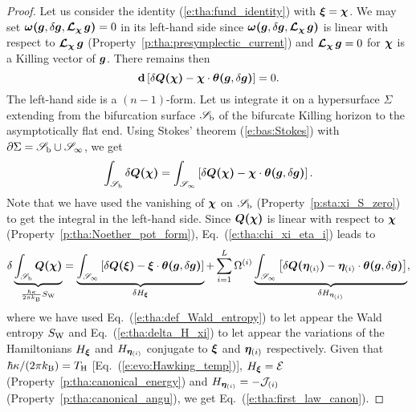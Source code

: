 \begin{proof}
Let us consider the identity (\ref{e:tha:fund_identity}) with $\bm{\xi} = \bm{\chi}$.
We may set $\bm{\omega}\textbf{(}\bm{g},\delta\bm{g}, \bm{\mathcal{L}}_{\bm{\chi}}\,\bm{g}\textbf{)} = 0$ in
its left-hand side since $\bm{\omega}\textbf{(}\bm{g},\delta\bm{g}, \bm{\mathcal{L}}_{\bm{\chi}}\,\bm{g}\textbf{)}$
is linear with respect to $\bm{\mathcal{L}}_{\bm{\chi}}\,\bm{g}$ (Property~\ref{p:tha:presymplectic_current})
and $\bm{\mathcal{L}}_{\bm{\chi}}\,\bm{g} = 0$ for $\bm{\chi}$ is a Killing vector of $\bm{g}$.
There remains then
\[
    \mathbf{d} \left[ \delta\bm{Q}\textbf{(}\bm{\chi}\textbf{)}
    - \bm{\chi}\cdot\bm{\theta}\textbf{(}\bm{g},\delta\bm{g}\textbf{)} \right] = 0 .
\]
The left-hand side is a $(n-1)$-form. Let us integrate it on a hypersurface $\Sigma$
extending from the bifurcation surface $\mathscr{S}_{\rm b}$ of the bifurcate
Killing horizon to the asymptotically flat end. Using
Stokes' theorem (\ref{e:bas:Stokes}) with $\partial\Sigma = \mathscr{S}_{\rm b} \cup \mathscr{S}_\infty$,
we get
\[
    \int_{\mathscr{S}_{\rm b}} \delta\bm{Q}\textbf{(}\bm{\chi}\textbf{)}
    = \int_{\mathscr{S}_\infty} \left[ \delta\bm{Q}\textbf{(}\bm{\chi}\textbf{)}
    - \bm{\chi}\cdot\bm{\theta}\textbf{(}\bm{g},\delta\bm{g}\textbf{)} \right] .
\]
Note that we have used the vanishing of $\bm{\chi}$ on $\mathscr{S}_{\rm b}$ (Property~\ref{p:sta:xi_S_zero})
to get the integral in the left-hand side. Since $\bm{Q}\textbf{(}\bm{\chi}\textbf{)}$
is linear with respect to $\bm{\chi}$ (Property~\ref{p:tha:Noether_pot_form}),
Eq.~(\ref{e:tha:chi_xi_eta_i}) leads to
\[
    \delta \underbrace{\int_{\mathscr{S}_{\rm b}}
    \bm{Q}\textbf{(}\bm{\chi}\textbf{)}}_{\frac{\hbar \kappa}{2\pi k_{\rm B}} S_{\rm W}} =
    \underbrace{\int_{\mathscr{S}_\infty} \left[ \delta\bm{Q}\textbf{(}\bm{\xi}\textbf{)}
    - \bm{\xi}\cdot\bm{\theta}\textbf{(}\bm{g},\delta\bm{g}\textbf{)} \right]}_{\delta H_{\bm{\xi}}}
    + \sum_{i=1}^{L} \Omega^{(i)}
    \underbrace{\int_{\mathscr{S}_\infty} \left[ \delta\bm{Q}\textbf{(}\bm{\eta}_{(i)}\textbf{)}
    - \bm{\eta}_{(i)}\cdot\bm{\theta}\textbf{(}\bm{g},\delta\bm{g}\textbf{)} \right]}_{\delta H_{\bm{\eta}_{(i)}}} ,
\]
where we have used Eq.~(\ref{e:tha:def_Wald_entropy}) to let appear
the Wald entropy $S_{\rm W}$ and
Eq.~(\ref{e:tha:delta_H_xi}) to let appear the
variations of the Hamiltonians $H_{\bm{\xi}}$ and $H_{\bm{\eta}_{(i)}}$ conjugate
to $\bm{\xi}$ and $\bm{\eta}_{(i)}$ respectively. Given that
$\hbar \kappa/(2\pi k_{\rm B}) = T_{\rm H}$ [Eq.~(\ref{e:evo:Hawking_temp})],
$H_{\bm{\xi}} = \mathcal{E}$ (Property~\ref{p:tha:canonical_energy})
and $H_{\bm{\eta}_{(i)}} = - \mathcal{J}_{(i)}$ (Property~\ref{p:tha:canonical_angu}),
we get Eq.~(\ref{e:tha:first_law_canon}).
\end{proof}

